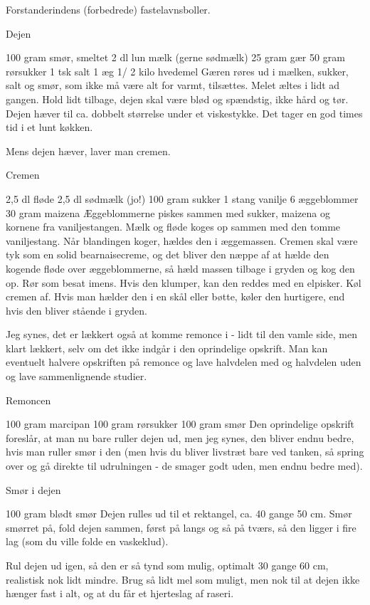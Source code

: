 \documentclass[
]{book}
\begin{document}
Forstanderindens (forbedrede) fastelavnsboller.

Dejen

100 gram smør, smeltet 2 dl lun mælk (gerne sødmælk) 25 gram gær 50 gram rørsukker 1 tsk salt 1 æg 1/ 2 kilo hvedemel Gæren røres ud i mælken, sukker, salt og smør, som ikke må være alt for varmt, tilsættes. Melet æltes i lidt ad gangen. Hold lidt tilbage, dejen skal være blød og spændstig, ikke hård og tør. Dejen hæver til ca. dobbelt størrelse under et viskestykke. Det tager en god times tid i et lunt køkken.

Mens dejen hæver, laver man cremen.

Cremen

2,5 dl fløde 2,5 dl sødmælk (jo!) 100 gram sukker 1 stang vanilje 6 æggeblommer 30 gram maizena Æggeblommerne piskes sammen med sukker, maizena og kornene fra vaniljestangen. Mælk og fløde koges op sammen med den tomme vaniljestang. Når blandingen koger, hældes den i æggemassen. Cremen skal være tyk som en solid bearnaisecreme, og det bliver den næppe af at hælde den kogende fløde over æggeblommerne, så hæld massen tilbage i gryden og kog den op. Rør som besat imens. Hvis den klumper, kan den reddes med en elpisker. Køl cremen af. Hvis man hælder den i en skål eller bøtte, køler den hurtigere, end hvis den bliver stående i gryden.

Jeg synes, det er lækkert også at komme remonce i - lidt til den vamle side, men klart lækkert, selv om det ikke indgår i den oprindelige opskrift. Man kan eventuelt halvere opskriften på remonce og lave halvdelen med og halvdelen uden og lave sammenlignende studier.

Remoncen

100 gram marcipan 100 gram rørsukker 100 gram smør Den oprindelige opskrift foreslår, at man nu bare ruller dejen ud, men jeg synes, den bliver endnu bedre, hvis man ruller smør i den (men hvis du bliver livstræt bare ved tanken, så spring over og gå direkte til udrulningen - de smager godt uden, men endnu bedre med).

Smør i dejen

100 gram blødt smør Dejen rulles ud til et rektangel, ca. 40 gange 50 cm. Smør smørret på, fold dejen sammen, først på langs og så på tværs, så den ligger i fire lag (som du ville folde en vaskeklud).

Rul dejen ud igen, så den er så tynd som mulig, optimalt 30 gange 60 cm, realistisk nok lidt mindre. Brug så lidt mel som muligt, men nok til at dejen ikke hænger fast i alt, og at du får et hjerteslag af raseri.
\end{document}
